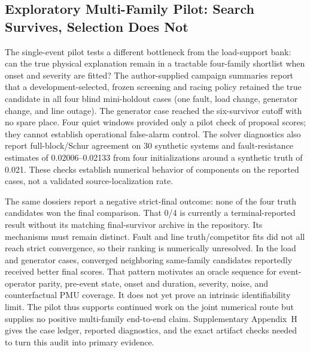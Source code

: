 \subsection{Exploratory Multi-Family Pilot: Search Survives, Selection Does Not}
\label{sec:pilot-results}

The single-event pilot tests a different bottleneck from the load-support bank: can the true physical explanation remain in a tractable four-family shortlist when onset and severity are fitted? The author-supplied campaign summaries report that a development-selected, frozen screening and racing policy retained the true candidate in all four blind mini-holdout cases (one fault, load change, generator change, and line outage). The generator case reached the six-survivor cutoff with no spare place. Four quiet windows provided only a pilot check of proposal scores; they cannot establish operational false-alarm control. The solver diagnostics also report full-block/Schur agreement on 30 synthetic systems and fault-resistance estimates of 0.02006--0.02133 from four initializations around a synthetic truth of 0.021. These checks establish numerical behavior of components on the reported cases, not a validated source-localization rate.

The same dossiers report a negative strict-final outcome: none of the four truth candidates won the final comparison. That 0/4 is currently a terminal-reported result without its matching final-survivor archive in the repository. Its mechanisms must remain distinct. Fault and line truth/competitor fits did not all reach strict convergence, so their ranking is numerically unresolved. In the load and generator cases, converged neighboring same-family candidates reportedly received better final scores. That pattern motivates an oracle sequence for event-operator parity, pre-event state, onset and duration, severity, noise, and counterfactual PMU coverage. It does not yet prove an intrinsic identifiability limit. The pilot thus supports continued work on the joint numerical route but supplies no positive multi-family end-to-end claim. Supplementary Appendix~H gives the case ledger, reported diagnostics, and the exact artifact checks needed to turn this audit into primary evidence.
